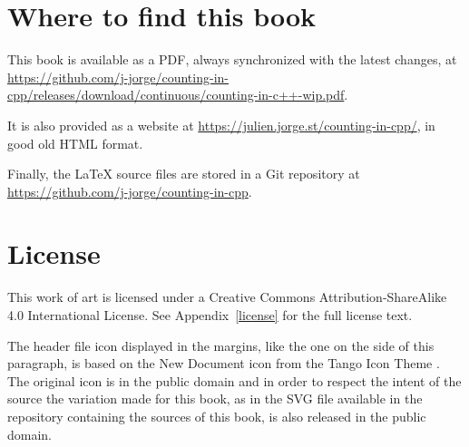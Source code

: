 \section{Where to find this book}

This book is available as a PDF, always synchronized with the latest
changes, at
\url{https://github.com/j-jorge/counting-in-cpp/releases/download/continuous/counting-in-c++-wip.pdf}.

It is also provided as a website at
\url{https://julien.jorge.st/counting-in-cpp/}, in good old HTML format.

Finally, the \LaTeX{} source files are stored in a Git repository at
\url{https://github.com/j-jorge/counting-in-cpp}.

\section{License}
This work of art is licensed under a Creative Commons
Attribution-ShareAlike 4.0 International License. See
Appendix~\ref{license} for the full license text.

%
%
The header file icon displayed in the margins, like the one on the
side of this paragraph, is based on the New Document icon from the
Tango Icon Theme \cite{tango-icon-theme}. The original icon is in the
public domain and in order to respect the intent of the source the
variation made for this book, as in the SVG file available in the
repository containing the sources of this book, is also released in
the public domain.

\renewcommand*\thesection{\arabic{chapter}.\arabic{section}}
